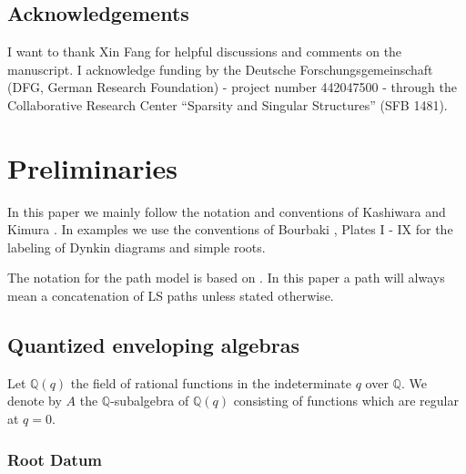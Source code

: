 \documentclass[final]{amsart}
\theoremstyle{plain}
\theoremstyle{definition}
\newcommand{\bbQ}{\mathbb Q}
\begin{document}
\subsection*{Acknowledgements}
I want to thank Xin Fang for helpful discussions and comments on the manuscript.
I acknowledge funding by the Deutsche Forschungsgemeinschaft (DFG, German Research Foundation) - project number 442047500 - through the Collaborative Research Center ``Sparsity and Singular Structures'' (SFB 1481).

\section{Preliminaries}
\label{section:preliminaries}

In this paper we mainly follow the notation and conventions of Kashiwara \cite{Kashiwara:CrystalBases-QuantizedUniversalEnvelopingAlgebras} and Kimura \cite{Kimura:QuantumUnipotentSubgroup-DualCanonicalBasis}.
In examples we use the conventions of Bourbaki \cite{Bourbaki:LieGroups-LieAlgebras-4-6}, Plates I - IX for the labeling of Dynkin diagrams and simple roots.

The notation for the path model is based on \cite{Littelmann:Paths-RootOperators-RepresentationTheory}.
In this paper a path will always mean a concatenation of LS paths unless stated otherwise.

\subsection{Quantized enveloping algebras}

Let $\bbQ(q)$ the field of rational functions in the indeterminate $q$ over $\bbQ$.
We denote by $A$ the $\bbQ$-subalgebra of $\bbQ(q)$ consisting of functions which are regular at $q = 0$.

\subsubsection*{Root Datum}
\label{section:definition-root-datum}
\end{document}

